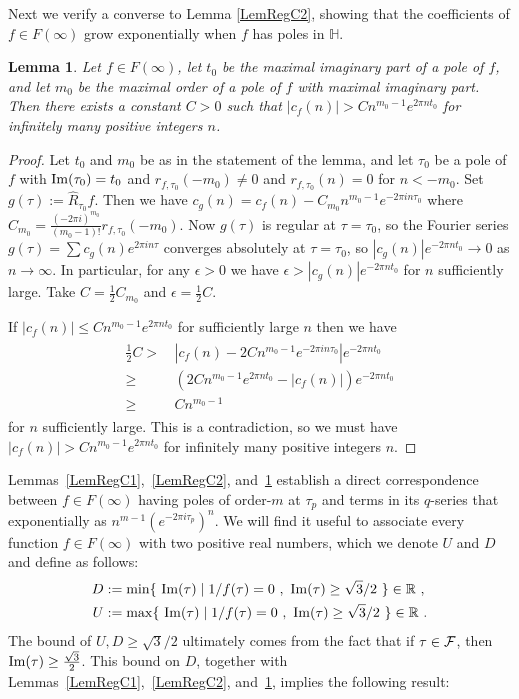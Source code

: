 \documentclass[11pt,a4paper]{article}
\newcommand{\e}{\epsilon}
\newtheorem{lem}[thm]{Lemma}
\def\R{\mathbb{R}}
\newcommand{\HH}{{\mathbb H}}				%
\newcommand{\RF}{\widehat{R}} 				%
\begin{document}
Next we verify a converse to Lemma \ref{LemRegC2}, showing that the coefficients of $f\in F(\infty)$ grow exponentially when $f$ has poles in $\HH$. 

\begin{lem}\label{LemRegC3}
Let $f\in F(\infty)$, let $t_0$ be the maximal imaginary part of a pole of $f$, and let $m_0$ be the maximal order of a pole of $f$ with maximal imaginary part. Then there exists a constant $C>0$ such that $|c_f(n)|>Cn^{m_0-1}e^{2\pi n t_0}$ for infinitely many positive integers $n$.
\end{lem}

\begin{proof}
Let $t_0$ and $m_0$ be as in the statement of the lemma, and let $\tau_0$ be a pole of $f$ with ${\rm Im}(\tau_0)=t_0$ and $r_{f,\tau_0}(-m_0)\neq 0$ and $r_{f,\tau_0}(n)=0$ for $n<-m_0$. Set $g(\tau):=\RF_{\tau_0}f$. Then we have $c_g(n)=c_f(n)-C_{m_0}n^{m_0-1}e^{-2\pi i n\tau_0}$ where $C_{m_0}=\frac{(-2\pi i)^{m_0}}{(m_0-1)!}r_{f,\tau_0}(-m_0)$. Now $g(\tau)$ is regular at $\tau=\tau_0$, so the Fourier series $g(\tau)=\sum c_g(n)e^{2\pi i n\tau}$ converges absolutely at $\tau=\tau_0$, so $|c_g(n)|e^{-2\pi n t_0}\to 0$ as $n\to \infty$. In particular, for any $\e>0$ we have  $\e>|c_g(n)|e^{-2\pi n t_0}$ for $n$ sufficiently large. Take $C=\frac12C_{m_0}$ and $\e=\frac12 C$. 

If $|c_f(n)|\leq Cn^{m_0-1}e^{2\pi n t_0}$ for sufficiently large $n$ then we have
\begin{align}
\begin{split}
	\tfrac12 C >&\,|c_f(n)-2Cn^{m_0-1}e^{-2\pi in \tau_0}|e^{-2\pi n t_0}\\
	\geq&\, 
	(2Cn^{m_0-1}e^{2\pi n t_0}-|c_f(n)|)e^{-2\pi nt_0}\\
	\geq&\,
	Cn^{m_0-1}
\end{split}
\end{align}
for $n$ sufficiently large. This is a contradiction, so we must have $|c_f(n)|>Cn^{m_0-1}e^{2\pi n t_0}$ for infinitely many positive integers $n$.
\end{proof}


Lemmas~\ref{LemRegC1},~\ref{LemRegC2}, and~\ref{LemRegC3} establish a direct correspondence between $f \in F(\infty)$ having poles of order-$m$ at $\tau_p$ and terms in its $q$-series that exponentially as $n^{m-1} (e^{-2\pi i \tau_p})^n$. We will find it useful to associate every function $f \in F(\infty)$ with two positive real numbers, which we denote $U$ and $D$ and define as follows:
\begin{align}
D &:={\rm min}\{ ~{\rm Im}(\tau) \mid 1/f(\tau) = 0 ~,~ {\rm Im}(\tau) \geq \sqrt{3}/2 ~\} \in \R~,
\label{eqDD}
\\
U &:={\rm max}\{~ {\rm Im}(\tau) \mid 1/f(\tau) = 0 ~,~ {\rm Im}(\tau) \geq \sqrt{3}/2 ~\} \in \R~.
\label{eqDU}
\end{align}
The bound of $U,D \geq \sqrt{3}/2$ ultimately comes from the fact that if $\tau \in {\cal F}$, then ${\rm Im}(\tau) \geq \tfrac{\sqrt{3}}{2}$. This bound on $D$, together with Lemmas~\ref{LemRegC1},~\ref{LemRegC2}, and~\ref{LemRegC3}, implies the following result: 
\end{document}
